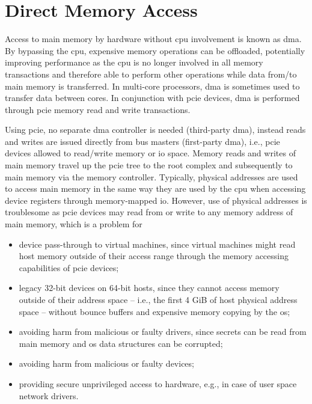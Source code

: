 \section{Direct Memory Access}
\label{sec:dma}

Access to main memory by hardware without \ac{cpu} involvement is known as
\acf{dma}. By bypassing the \ac{cpu}, expensive memory operations can be
offloaded, potentially improving performance as the \ac{cpu} is no longer
involved in all memory transactions and therefore able to perform other
operations while data from/to main memory is transferred. In multi-core
processors, \ac{dma} is sometimes used to transfer data between cores. In
conjunction with \ac{pcie} devices, \ac{dma} is performed through \ac{pcie}
memory read and write transactions.

Using \ac{pcie}, no separate \ac{dma} controller is needed (third-party
\ac{dma}), instead reads and writes are issued directly from bus masters
(first-party \ac{dma}), i.e., \ac{pcie} devices allowed to read/write memory or
\ac{io} space. Memory reads and writes of main memory travel up the \ac{pcie}
tree to the root complex and subsequently to main memory via the memory
controller. Typically, physical addresses are used to access main memory in the
same way they are used by the \ac{cpu} when accessing device registers through
memory-mapped \ac{io}. However, use of physical addresses is troublesome as
\ac{pcie} devices may read from or write to any memory address of main memory,
which is a problem for

\begin{itemize}
    \item device pass-through to virtual machines, since virtual machines might
        read host memory outside of their access range through the memory
        accessing capabilities of \ac{pcie} devices;
    \item legacy 32-bit devices on 64-bit hosts, since they cannot access memory
        outside of their address space -- i.e., the first 4 GiB of host physical
        address space -- without bounce buffers and expensive memory copying by
        the \ac{os};
    \item avoiding harm from malicious or faulty drivers, since secrets can be
        read from main memory and \ac{os} data structures can be corrupted;
    \item avoiding harm from malicious or faulty devices;
    \item providing secure unprivileged access to hardware, e.g., in case of
        user space network drivers.
\end{itemize}

